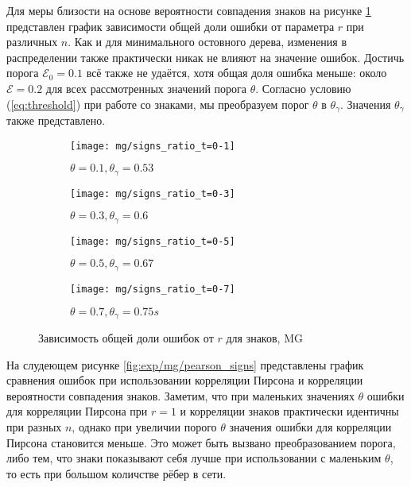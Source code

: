 Для меры близости на основе вероятности совпадения знаков на рисунке \ref{fig:exp/mg/signs_ration} представлен график зависимости общей доли ошибки от параметра $r$ при различных $n$. Как и для минимального остовного дерева, изменения в распределении также практически никак не влияют на значение ошибок. Достичь порога $\mathcal{E}_0=0.1$  всё также не удаётся, хотя общая доля ошибка меньше: около $\mathcal{E}=0.2$ для всех рассмотренных значений порога $\theta$. Согласно условию (\ref{eq:threshold}) при работе со знаками, мы преобразуем порог $\theta$ в $\theta_\gamma$. Значения $\theta_\gamma$ также представлено.


\begin{figure}[H]
     \centering
     \begin{subfigure}[b]{0.49\textwidth}
         \centering
         \texttt{[image: mg/signs\_ratio\_t=0-1]}
         \caption{$\theta=0.1, \theta_\gamma=0.53$}
     \end{subfigure}
     \hfill
     \begin{subfigure}[b]{0.49\textwidth}
         \centering
         \texttt{[image: mg/signs\_ratio\_t=0-3]}
         \caption{$\theta=0.3, \theta_\gamma=0.6$}
     \end{subfigure}
     \vfill
     \begin{subfigure}[b]{0.49\textwidth}
         \centering
         \texttt{[image: mg/signs\_ratio\_t=0-5]}
         \caption{$\theta=0.5, \theta_\gamma=0.67$}
     \end{subfigure}
     \hfill
     \begin{subfigure}[b]{0.49\textwidth}
         \centering
         \texttt{[image: mg/signs\_ratio\_t=0-7]}
         \caption{$\theta=0.7,\theta_\gamma=0.75s$}
     \end{subfigure}
     

        \caption{Зависимость общей доли ошибок от $r$ для знаков, MG}
        \label{fig:exp/mg/signs_ration}
\end{figure}  


На слудеющем рисунке \ref{fig:exp/mg/pearson_signs} представлены график сравнения ошибок при использовании корреляции Пирсона и корреляции вероятности совпадения знаков. Заметим, что при маленьких значениях $\theta$ ошибки для корреляции Пирсона при $r=1$ и корреляции знаков практически идентичны при разных $n$, однако при увеличии порого $\theta$ значения ошибки для корреляции Пирсона становится меньше. Это может быть вызвано преобразованием порога, либо тем, что знаки показывают себя лучше при использовании с маленьким $\theta$, то есть при большом количстве рёбер в сети.

